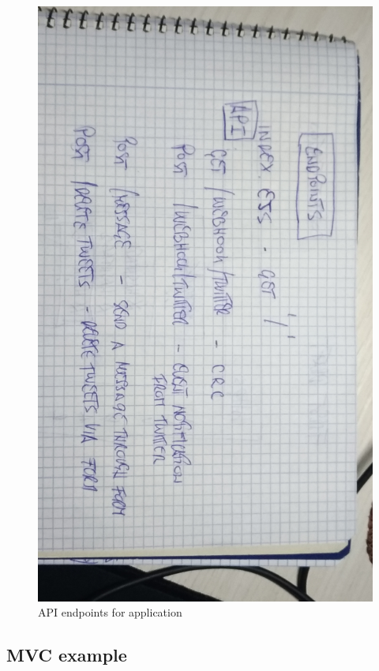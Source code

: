 \documentclass[12pt]{article} %
\begin{document}
	\begin{figure}[H] %
	\includegraphics[width=0.7\linewidth]{images/API}
	\caption{API endpoints for application}
	\label{API)}
	\end{figure}

\subsection{MVC example}
\end{document}

